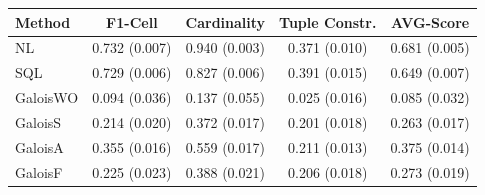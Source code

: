 \begin{tabular}{lcccc}
\toprule
Method & F1-Cell & Cardinality & Tuple Constr. & AVG-Score \\
\midrule
NL & 0.732 (0.007) & 0.940 (0.003) & 0.371 (0.010) & 0.681 (0.005) \\
SQL & 0.729 (0.006) & 0.827 (0.006) & 0.391 (0.015) & 0.649 (0.007) \\
GaloisWO & 0.094 (0.036) & 0.137 (0.055) & 0.025 (0.016) & 0.085 (0.032) \\
GaloisS & 0.214 (0.020) & 0.372 (0.017) & 0.201 (0.018) & 0.263 (0.017) \\
GaloisA & 0.355 (0.016) & 0.559 (0.017) & 0.211 (0.013) & 0.375 (0.014) \\
GaloisF & 0.225 (0.023) & 0.388 (0.021) & 0.206 (0.018) & 0.273 (0.019) \\
\bottomrule
\end{tabular}